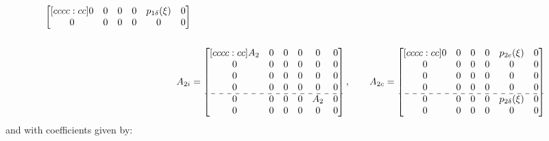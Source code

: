 \documentclass[../main.tex]{subfiles}
\begin{document}
\begin{align}
\begin{bmatrix}[cccc:cc]
		0 & 0 & 0 & 0 & p_{1\delta}(\xi) & 0\\
		0 & 0 & 0 & 0 & 0 & 0		
		\end{bmatrix} \nonumber\\
		\nonumber\\
		A_{2i} &= 
		\begin{bmatrix}[cccc:cc]
		A_2 & 0 & 0 & 0 & 0 & 0\\
		0 & 0 & 0 & 0 & 0 & 0\\
		0 & 0 & 0 & 0 & 0 & 0\\
		0 & 0 & 0 & 0 & 0 & 0\\ \hdashline
		0 & 0 & 0 & 0 & A_2 & 0\\ 
		0 & 0 & 0 & 0 & 0 & 0
		\end{bmatrix}, \qquad
		A_{2c} = \begin{bmatrix}[cccc:cc]	
		0 & 0 & 0 & 0 & p_{2e}(\xi) & 0\\
		0 & 0 & 0 & 0 & 0 & 0\\
		0 & 0 & 0 & 0 & 0 & 0\\
		0 & 0 & 0 & 0 & 0 & 0\\ \hdashline
		0 & 0 & 0 & 0 & p_{2\delta}(\xi) & 0\\
		0 & 0 & 0 & 0 & 0 & 0		
		\end{bmatrix}	\nonumber	
	\end{align}
	and with coefficients given by:
\end{document}
